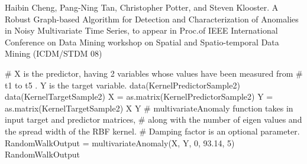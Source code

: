 \begin{References}\relax
[1] Haibin Cheng, Pang-Ning Tan, Christopher Potter, and Steven Klooster. 
A Robust Graph-based Algorithm for Detection and Characterization of Anomalies in Noisy
Multivariate Time Series, to appear in Proc.of IEEE International Conference on Data Mining
workshop on Spatial and Spatio-temporal Data Mining (ICDM/STDM 08)
\end{References}
\begin{Examples}
\begin{ExampleCode}
# X is the predictor, having 2 variables whose values have been measured from
# t1 to t5 . Y is the target variable.
data(KernelPredictorSample2)
data(KernelTargetSample2)
X = as.matrix(KernelPredictorSample2)
Y = as.matrix(KernelTargetSample2)
X
Y
# multivariateAnomaly function takes in input target and predictor matrices, 
# along with the number of eigen values and the spread width of the RBF kernel.
# Damping factor is an optional parameter.
RandomWalkOutput = multivariateAnomaly(X, Y, 0, 93.14, 5)
RandomWalkOutput
\end{ExampleCode}
\end{Examples}

